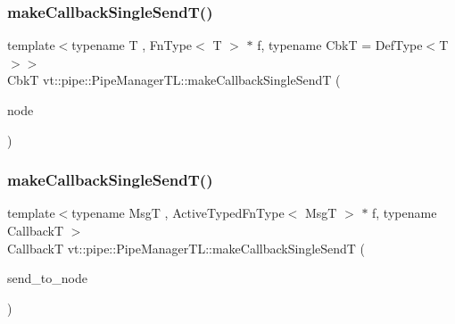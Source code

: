\mbox{\label{structvt_1_1pipe_1_1_pipe_manager_t_l_aff917693da92fdfb5b275c7cf61e5e8b}} 
\subsubsection{\texorpdfstring{make\+Callback\+Single\+Send\+T()}{makeCallbackSingleSendT()}\hspace{0.1cm}{\footnotesize\ttfamily [1/2]}}
{\footnotesize\ttfamily template$<$typename T , Fn\+Type$<$ T $>$ $\ast$ f, typename CbkT  = Def\+Type$<$\+T$>$$>$ \\
CbkT vt\+::pipe\+::\+Pipe\+Manager\+T\+L\+::make\+Callback\+Single\+SendT (\begin{DoxyParamCaption}\item[{\hyperlink{namespacevt_a866da9d0efc19c0a1ce79e9e492f47e2}{Node\+Type} const \&}]{node }\end{DoxyParamCaption})}

\mbox{\label{structvt_1_1pipe_1_1_pipe_manager_t_l_ac4d276c82d9f04628263ffd07841fdcf}} 
\subsubsection{\texorpdfstring{make\+Callback\+Single\+Send\+T()}{makeCallbackSingleSendT()}\hspace{0.1cm}{\footnotesize\ttfamily [2/2]}}
{\footnotesize\ttfamily template$<$typename MsgT , Active\+Typed\+Fn\+Type$<$ Msg\+T $>$ $\ast$ f, typename CallbackT $>$ \\
CallbackT vt\+::pipe\+::\+Pipe\+Manager\+T\+L\+::make\+Callback\+Single\+SendT (\begin{DoxyParamCaption}\item[{\hyperlink{namespacevt_a866da9d0efc19c0a1ce79e9e492f47e2}{Node\+Type} const \&}]{send\+\_\+to\+\_\+node }\end{DoxyParamCaption})}

